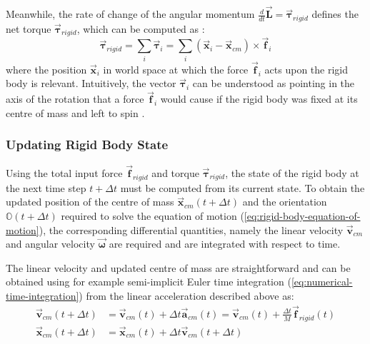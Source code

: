 \documentclass[oneside, a4paper]{book}
\newcommand\vek[1]{\vec{\bm{#1}}}
\newcommand\br[1]{\left(#1\right)}
\begin{document}
    Meanwhile, the rate of change of the angular momentum  $\frac{d}{dt}\vek{L}=\vek{\tau}_{rigid}$ defines the net torque $\vek{\tau}_{rigid}$, which can be computed as \autocite{physically-based-rigids}:
    \begin{equation}\label{eq:rigid-net-torque}
      \vek{\tau}_{rigid} = \sum_i \vek{\tau}_i = \sum_i (\vek{x}_i-\vek{x}_{cm}) \times \vek{f}_i
    \end{equation}
    where the position $\vek{x}_i$ in world space at which the force $\vek{f}_i$ acts upon the rigid body is relevant. Intuitively, the vector $\vek{\tau}_i$ can be understood as pointing in the axis of the rotation that a force $\vek{f}_i$ would cause if the rigid body was fixed at its centre of mass and left to spin \autocite{physically-based-rigids}.
    
    \subsubsection{Updating Rigid Body State}
    Using the total input force $\vek{f}_{rigid}$ and torque $\vek{\tau}_{rigid}$, the state of the rigid body at the next time step $t+\Delta t$ must be computed from its current state. To obtain the updated position of the centre of mass $\vek{x}_{cm}\br{t+\Delta t}$ and the orientation $\mathds{O}\br{t+\Delta t}$ required to solve the equation of motion (\autoref{eq:rigid-body-equation-of-motion}), the corresponding differential quantities, namely the linear velocity $\vek{v}_{cm}$ and angular velocity $\vek{\omega}$ are required and are integrated with respect to time. 

    The linear velocity and updated centre of mass are straightforward and can be obtained using for example semi-implicit Euler time integration (\autoref{eq:numerical-time-integration}) from the linear acceleration described above as:
    \begin{align}
      \vek{v}_{cm}(t+\Delta t) &= \vek{v}_{cm}(t) + \Delta t \vek{a}_{cm}\br{t} = \vek{v}_{cm}(t) + \frac{\Delta t}{M} \vek{f}_{rigid}\br{t}\label{eq:rigid-vcm-update}\\
      \vek{x}_{cm}\br{t+\Delta t} &= \vek{x}_{cm}\br{t} + \Delta t \vek{v}_{cm}(t+\Delta t)\label{eq:rigid-xcm-update}
    \end{align}
\end{document}
